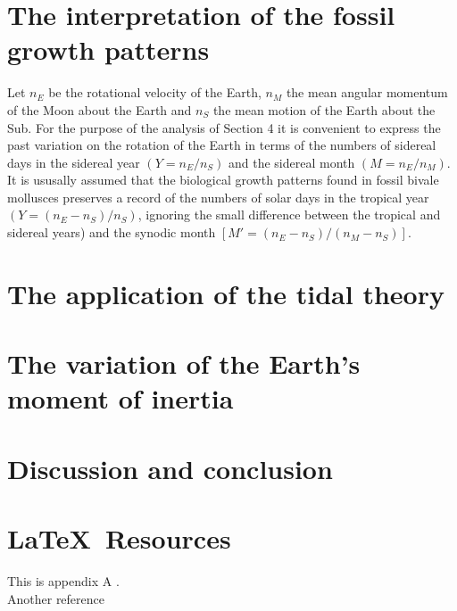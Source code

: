 \documentclass[master, copyright]{resources/class/ms_thesis}
\begin{document}
\chapter{The interpretation of the fossil growth patterns}
Let $n_{E}$ be the rotational velocity of the Earth, $n_{M}$ the mean angular momentum of the Moon about the Earth and $n_{S}$ the mean motion of the Earth about the Sub. For the purpose of the analysis of Section 4 it is convenient to express the past variation on the rotation of the Earth in terms of the numbers of sidereal days in the sidereal year $(Y=n_{E}/n_{S})$ and the sidereal month $(M=n_{E}/n_{M})$.
\newline \\
It is ususally assumed that the biological growth patterns found in fossil bivale mollusces preserves a record of the numbers of solar days in the tropical  year $(Y=(n_{E}-n_{S})/n_{S})$, ignoring the small difference between the tropical and sidereal years) and the synodic month $[M'=(n_{E}-n_{S})/(n_{M}-n_{S})]$.
\newline \\
\chapter{The application of the tidal theory}

\chapter{The variation of the Earth's moment of inertia}

\chapter{Discussion and conclusion}


\appendix

\chapter{\LaTeX\ Resources}
This is appendix A \cite{ref01}.
\newline \\
Another reference \cite{ref02}
\begin{center}
  
\end{center}



\end{document}

